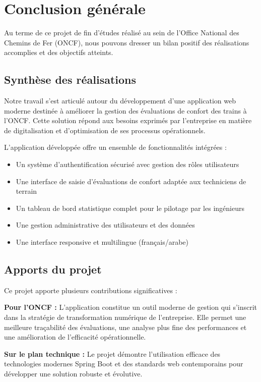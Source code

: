 \chapter*{Conclusion générale}

Au terme de ce projet de fin d'études réalisé au sein de l'Office National des Chemins de Fer (ONCF), nous pouvons dresser un bilan positif des réalisations accomplies et des objectifs atteints.

\section*{Synthèse des réalisations}

Notre travail s'est articulé autour du développement d'une application web moderne destinée à améliorer la gestion des évaluations de confort des trains à l'ONCF. Cette solution répond aux besoins exprimés par l'entreprise en matière de digitalisation et d'optimisation de ses processus opérationnels.

L'application développée offre un ensemble de fonctionnalités intégrées :
\begin{itemize}
    \item Un système d'authentification sécurisé avec gestion des rôles utilisateurs
    \item Une interface de saisie d'évaluations de confort adaptée aux techniciens de terrain
    \item Un tableau de bord statistique complet pour le pilotage par les ingénieurs
    \item Une gestion administrative des utilisateurs et des données
    \item Une interface responsive et multilingue (français/arabe)
\end{itemize}

\section*{Apports du projet}

Ce projet apporte plusieurs contributions significatives :

\textbf{Pour l'ONCF :} L'application constitue un outil moderne de gestion qui s'inscrit dans la stratégie de transformation numérique de l'entreprise. Elle permet une meilleure traçabilité des évaluations, une analyse plus fine des performances et une amélioration de l'efficacité opérationnelle.

\textbf{Sur le plan technique :} Le projet démontre l'utilisation efficace des technologies modernes Spring Boot et des standards web contemporains pour développer une solution robuste et évolutive.

